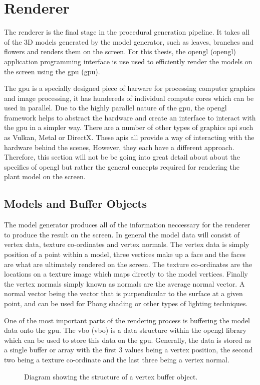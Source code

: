 \section{Renderer}

\noindent
The renderer is the final stage in the procedural generation pipeline. It takes all of the 3D models generated by the model generator, such as leaves, branches and flowers and renders them on the screen.  For this thesis, the \acrlong{opengl} (\acrshort{opengl}) application programming interface is use used to efficiently render the models on the screen using the \acrlong{gpu} (\acrshort{gpu}). 

The \acrshort{gpu} is a specially designed piece of harware for processing computer graphics and image processing, it has hundereds of individual compute cores which can be used in parallel. Due to the highly parallel nature of the \acrshort{gpu}, the \acrshort{opengl} framework helps to abstract the hardware and create an interface to interact with the \acrshort{gpu} in a simpler way. There are a number of other types of graphics \acrshort{api} such as Vulkan, Metal or DirectX. These \acrshort{api}s all provide a way of interacting with the hardware behind the scenes, However, they each have a different approach. Therefore, this section will not be be going into great detail about about the specifics of \acrshort{opengl} but rather the general concepts required for rendering the plant model on the screen.

\subsection{Models and Buffer Objects}

The model generator produces all of the information neccessary for the renderer to produce the result on the screen. In general the model data will consist of vertex data, texture co-ordinates and vertex normals. The vertex data is simply position of a point within a model, three vertices make up a face and the faces are what are ultimately rendered on the screen. The texture co-ordinates are the locations on a texture image which maps directly to the model vertices. Finally the vertex normals simply known as normals are the average normal vector. A normal vector being the vector that is purpendicular to the surface at a given point, and can be used for Phong shading or other types of lighting techniques.  

One of the most important parts of the rendering process is buffering the model data onto the \acrshort{gpu}. The \acrlong{vbo} (\acrshort{vbo}) is a data structure within the \acrshort{opengl} library which can be used to store this data on the \acrshort{gpu}. Generally, the data is stored as a single buffer or array with the first 3 values being a vertex position, the second two being a texture co-ordinate and the last three being a vertex normal. 

\begin{figure}[htbp]
	{\centering
		\vspace{7px}
		\setlength{\fboxrule}{1pt}
		\caption{Diagram showing the structure of a vertex buffer object.}
	}
\end{figure}
\FloatBarrier

 









